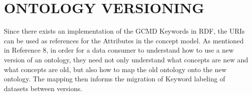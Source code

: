 
\chapter{ONTOLOGY VERSIONING}


Since there exists an implementation of the GCMD Keywords in RDF, the URIs can be used as references for the Attributes in the concept model.  As mentioned in Reference 8, in order for a data consumer to understand how to use a new version of an ontology, they need not only understand what concepts are new and what concepts are old, but also how to map the old ontology onto the new ontology.  The mapping then informs the migration of Keyword labeling of datasets between versions.